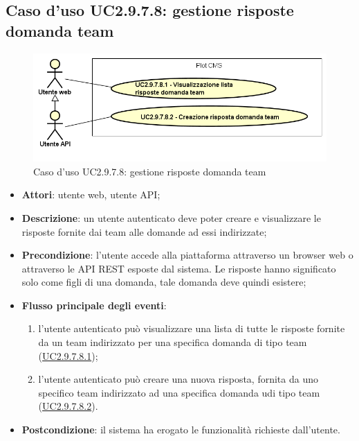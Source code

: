 \subsection{Caso d'uso UC2.9.7.8: gestione risposte domanda team}

        \begin{figure}[H]
            \centering
            \includegraphics[scale=0.65, width=\textwidth]{immagini/usecase/UC2-9-7-8.png}
            \caption{Caso d'uso UC2.9.7.8: gestione risposte domanda team}\label{fig:UC2.9.7.8} 
        \end{figure}
\begin{itemize}
\item \textbf{Attori}: utente web, utente API;
\item \textbf{Descrizione}: un utente autenticato deve poter creare e visualizzare le risposte fornite dai team alle domande ad essi indirizzate; 
      \item \textbf{Precondizione}: l'utente accede alla piattaforma attraverso un browser web o attraverso le API REST esposte dal sistema. Le risposte hanno significato solo come figli di una domanda, tale domanda deve quindi esistere;

        \item \textbf{Flusso principale degli eventi}:
          \begin{enumerate}
          \item l'utente autenticato può visualizzare una lista di tutte le risposte fornite da un team indirizzato per una specifica domanda di tipo team (\hyperlink{UC2.9.7.8.1}{UC2.9.7.8.1});
          \item l'utente autenticato può creare una nuova risposta, fornita da uno specifico team indirizzato ad una specifica domanda udi tipo team (\hyperlink{UC2.9.7.8.2}{UC2.9.7.8.2}).

      \end{enumerate}
    \item \textbf{Postcondizione}: il sistema ha erogato le funzionalità richieste dall'utente.
  \end{itemize}
\hypertarget{UC2.9.7.8.1}{}
